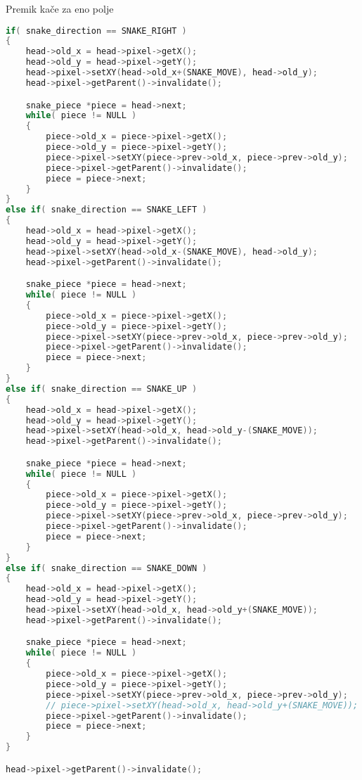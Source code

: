 \documentclass{article}
\begin{document}
\noindent
Premik ka\v{c}e za eno polje
\begin{lstlisting}[language=c++]
if( snake_direction == SNAKE_RIGHT )
{
    head->old_x = head->pixel->getX();
    head->old_y = head->pixel->getY();
    head->pixel->setXY(head->old_x+(SNAKE_MOVE), head->old_y);
    head->pixel->getParent()->invalidate();

    snake_piece *piece = head->next;
    while( piece != NULL )
    {
        piece->old_x = piece->pixel->getX();
        piece->old_y = piece->pixel->getY();
        piece->pixel->setXY(piece->prev->old_x, piece->prev->old_y);
        piece->pixel->getParent()->invalidate();
        piece = piece->next;
    }
}
else if( snake_direction == SNAKE_LEFT )
{
    head->old_x = head->pixel->getX();
    head->old_y = head->pixel->getY();
    head->pixel->setXY(head->old_x-(SNAKE_MOVE), head->old_y);
    head->pixel->getParent()->invalidate();

    snake_piece *piece = head->next;
    while( piece != NULL )
    {
        piece->old_x = piece->pixel->getX();
        piece->old_y = piece->pixel->getY();
        piece->pixel->setXY(piece->prev->old_x, piece->prev->old_y);
        piece->pixel->getParent()->invalidate();
        piece = piece->next;
    }
}
else if( snake_direction == SNAKE_UP )
{
    head->old_x = head->pixel->getX();
    head->old_y = head->pixel->getY();
    head->pixel->setXY(head->old_x, head->old_y-(SNAKE_MOVE));
    head->pixel->getParent()->invalidate();

    snake_piece *piece = head->next;
    while( piece != NULL )
    {
        piece->old_x = piece->pixel->getX();
        piece->old_y = piece->pixel->getY();
        piece->pixel->setXY(piece->prev->old_x, piece->prev->old_y);
        piece->pixel->getParent()->invalidate();
        piece = piece->next;
    }
}
else if( snake_direction == SNAKE_DOWN )
{
    head->old_x = head->pixel->getX();
    head->old_y = head->pixel->getY();
    head->pixel->setXY(head->old_x, head->old_y+(SNAKE_MOVE));
    head->pixel->getParent()->invalidate();

    snake_piece *piece = head->next;
    while( piece != NULL )
    {
        piece->old_x = piece->pixel->getX();
        piece->old_y = piece->pixel->getY();
        piece->pixel->setXY(piece->prev->old_x, piece->prev->old_y);
        // piece->pixel->setXY(head->old_x, head->old_y+(SNAKE_MOVE));
        piece->pixel->getParent()->invalidate();
        piece = piece->next;
    }
}

head->pixel->getParent()->invalidate();
\end{lstlisting}
\end{document}
